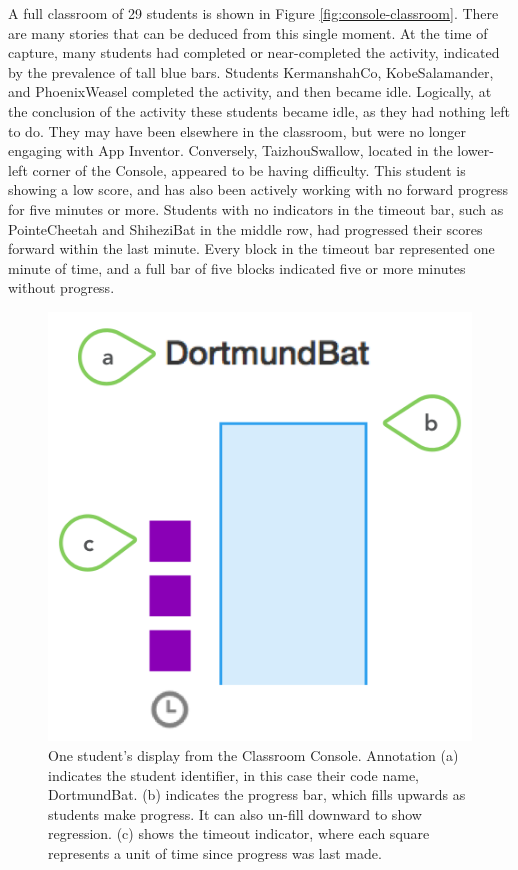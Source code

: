 A full classroom of 29 students is shown in Figure \ref{fig:console-classroom}. There are many stories that can be deduced from this single moment. At the time of capture, many students had completed or near-completed the activity, indicated by the prevalence of tall blue bars. Students KermanshahCo, KobeSalamander, and PhoenixWeasel completed the activity, and then became idle. Logically, at the conclusion of the activity these students became idle, as they had nothing left to do. They may have been elsewhere in the classroom, but were no longer engaging with App Inventor. Conversely, TaizhouSwallow, located in the lower-left corner of the Console, appeared to be having difficulty. This student is showing a low score, and has also been actively working with no forward progress for five minutes or more. Students with no indicators in the timeout bar, such as PointeCheetah and ShiheziBat in the middle row, had progressed their scores forward within the last minute. Every block in the timeout bar represented one minute of time, and a full bar of five blocks indicated five or more minutes without progress. 

\begin{figure}
  \centering
      \includegraphics{images/ch4-console-single-annotated}
  \caption[One Student in the Classroom Console]{One student's display from the Classroom Console. Annotation (a) indicates the student identifier, in this case their code name, DortmundBat. (b) indicates the progress bar, which fills upwards as students make progress. It can also un-fill downward to show regression. (c) shows the timeout indicator, where each square represents a unit of time since progress was last made.}
  \label{fig:console-single-annotated}
\end{figure}


